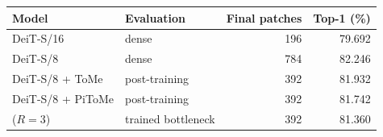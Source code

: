 \begin{tabular}{llrr}
\toprule
Model & Evaluation & Final patches & Top-1 (\%) \\
\midrule
DeiT-S/16 & dense & 196 & 79.692 \\
DeiT-S/8 & dense & 784 & 82.246 \\
DeiT-S/8 + ToMe & post-training & 392 & 81.932 \\
DeiT-S/8 + PiToMe & post-training & 392 & 81.742 \\
\mn{} ($R=3$) & trained bottleneck & 392 & 81.360 \\
\bottomrule
\end{tabular}
